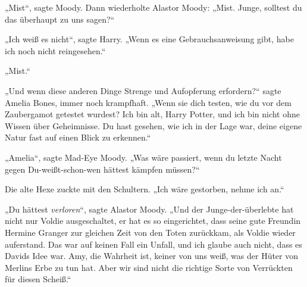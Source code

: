 „Mist“, sagte Moody. Dann wiederholte Alastor Moody: „Mist. Junge, solltest du das überhaupt zu uns sagen?“

„Ich weiß es nicht“, sagte Harry. „Wenn es eine Gebrauchsanweisung gibt, habe ich noch nicht reingesehen.“

„Mist.“

„Und wenn diese anderen Dinge Strenge und Aufopferung erfordern?“ sagte Amelia Bones, immer noch krampfhaft. „Wenn sie dich testen, wie du vor dem Zaubergamot getestet wurdest? Ich bin alt, Harry Potter, und ich bin nicht ohne Wissen über Geheimnisse. Du hast gesehen, wie ich in der Lage war, deine eigene Natur fast auf einen Blick zu erkennen.“

„Amelia“, sagte Mad-Eye Moody. „Was wäre passiert, wenn du letzte Nacht gegen Du-weißt-schon-wen hättest kämpfen müssen?“

Die alte Hexe zuckte mit den Schultern.
„Ich wäre gestorben, nehme ich an.“

„Du hättest \emph{verloren}“, sagte Alastor Moody. „Und der Junge-der-überlebte hat nicht nur Voldie ausgeschaltet, er hat es so eingerichtet, dass seine gute Freundin Hermine Granger zur gleichen Zeit von den Toten zurückkam, als Voldie wieder auferstand. Das war auf keinen Fall ein Unfall, und ich glaube auch nicht, dass es Davids Idee war. Amy, die Wahrheit ist, keiner von uns weiß, was der Hüter von Merlins Erbe zu tun hat. Aber wir sind nicht die richtige Sorte von Verrückten für diesen Scheiß.“


